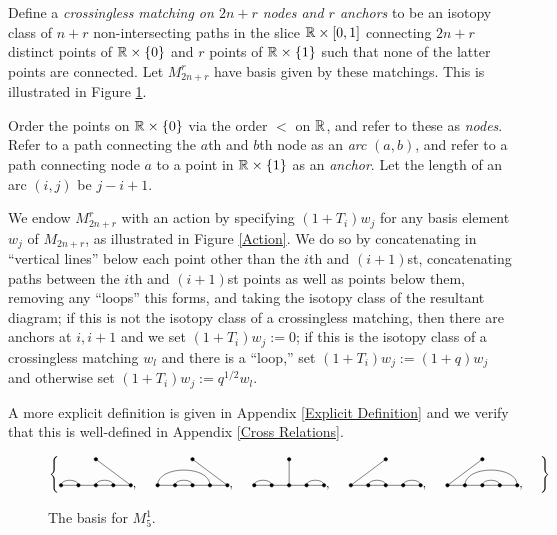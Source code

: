 \documentclass{amsart}
\begin{document}
  \begin{definition}
  Define a \emph{crossingless matching on $2n + r$ nodes and $r$ anchors} to be an isotopy class of $n + r$ non-intersecting paths in the slice $\mathbb{R} \times \left[ 0,1 \right]$ connecting $2n + r$ distinct points of $\mathbb{R} \times \left\{ 0 \right\}$ and $r$ points of $\mathbb{R} \times \left\{ 1 \right\}$ such that none of the latter points are connected. 
  Let $M_{2n + r}^r$ have basis given by these matchings.
  This is illustrated in Figure \ref{S5 Basis}.
 
  Order the points on $\mathbb{R} \times \left\{ 0 \right\}$ via the order $<$ on $\mathbb{R}$, and refer to these as \emph{nodes}.
  Refer to a path connecting the $a$th and $b$th node as an \emph{arc} $(a,b)$, and refer to a path connecting node $a$ to a point in $\mathbb{R} \times \left\{ 1 \right\}$ as an \emph{anchor}.
  Let the length of an arc $(i,j)$ be $j - i + 1$.


  We endow $M_{2n + r}^r$ with an action by specifying $(1 + T_i)w_j$ for any basis element $w_j$ of $M_{2n + r}$, as illustrated in Figure \ref{Action}.
  We do so by concatenating in ``vertical lines'' below each point other than the $i$th and $(i+1)$st, concatenating paths between the $i$th and $(i+1)$st points as well as points below them, removing any ``loops'' this forms, and taking the isotopy class of the resultant diagram;
  if this is not the isotopy class of a crossingless matching, then there are anchors at $i,i+1$ and we set $(1 + T_i)w_j := 0$;
  if this is the isotopy class of a crossingless matching $w_l$ and there is a ``loop,'' set $(1 + T_i)w_j := (1 + q)w_j$ and otherwise set $(1 + T_i)w_j := q^{1/2}w_l$.
  
  A more explicit definition is given in Appendix \ref{Explicit Definition} and we verify that this is well-defined in Appendix \ref{Cross Relations}.
  \end{definition}
  \begin{figure} 
    \def\cbasisspacing{5mm}
    \begin{adjustbox}{width=\textwidth}
    $\cbr{
      \begin{gathered}
        \GeneralizedMatching{5}{1/2, 3/4}{1}{5/1}{3/4}, \hspace{\cbasisspacing}
        \GeneralizedMatching{5}{1/4, 2/3}{1}{5/1}{3/4}, \hspace{\cbasisspacing}
        \GeneralizedMatching{5}{1/2, 4/5}{1}{3/1}{3/4}, \hspace{\cbasisspacing}
        \GeneralizedMatching{5}{2/3, 4/5}{1}{1/1}{3/4}, \hspace{\cbasisspacing}
        \GeneralizedMatching{5}{2/5, 3/4}{1}{1/1}{3/4}, \hspace{\cbasisspacing}
       \end{gathered}}$ 
     \end{adjustbox}
       \caption{The basis for $M_5^1$.}
    \label{S5 Basis}
   \end{figure} 
\end{document}
